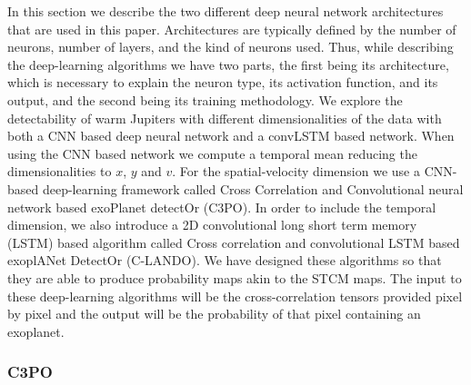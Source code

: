 \documentclass{aa}
\begin{document}
In this section we describe the two different deep neural network architectures that are used in this paper.
Architectures are typically defined by the number of neurons, number of layers, and the kind of neurons used.
Thus, while describing the deep-learning algorithms we have two parts, the first being its architecture, which is necessary to explain the neuron type, its activation function, and its output, and the second being its training methodology.
We explore the detectability of warm Jupiters with different dimensionalities of the data with both a CNN based deep neural network and a convLSTM based network.
When using the CNN based network we compute a temporal mean reducing the dimensionalities to $x$, $y$ and $v$.
For the spatial-velocity dimension we use a CNN-based deep-learning framework called Cross Correlation and Convolutional neural network based exoPlanet detectOr (C3PO).
In order to include the temporal dimension, we also introduce a 2D convolutional long short term memory (LSTM) based algorithm called Cross correlation and convolutional LSTM based exoplANet DetectOr (C-LANDO).
We have designed these algorithms so that they are able to produce probability maps akin to the STCM maps. 
The input to these deep-learning algorithms will be the cross-correlation tensors provided pixel by pixel and the output will be the probability of that pixel containing an exoplanet. %

\subsubsection{C3PO}
\end{document}
